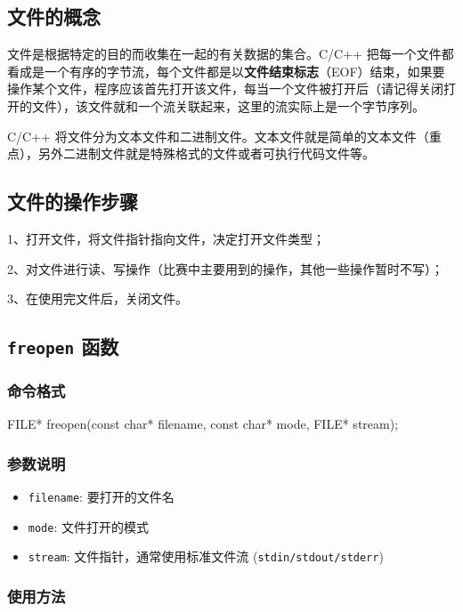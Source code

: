 
\subsection{文件的概念}

文件是根据特定的目的而收集在一起的有关数据的集合。C/C++ 把每一个文件都看成是一个有序的字节流，每个文件都是以\textbf{文件结束标志}（EOF）结束，如果要操作某个文件，程序应该首先打开该文件，每当一个文件被打开后（请记得关闭打开的文件），该文件就和一个流关联起来，这里的流实际上是一个字节序列。  

C/C++ 将文件分为文本文件和二进制文件。文本文件就是简单的文本文件（重点），另外二进制文件就是特殊格式的文件或者可执行代码文件等。

\subsection{文件的操作步骤}

 1、打开文件，将文件指针指向文件，决定打开文件类型；  

 2、对文件进行读、写操作（比赛中主要用到的操作，其他一些操作暂时不写）；  

 3、在使用完文件后，关闭文件。  

\subsection{\texttt{freopen} 函数}

\subsubsection{命令格式}

\begin{cppcode}
FILE* freopen(const char* filename, const char* mode, FILE* stream);
\end{cppcode}

\subsubsection{参数说明}

\begin{itemize}
\item \texttt{filename}: 要打开的文件名
\item \texttt{mode}: 文件打开的模式
\item \texttt{stream}: 文件指针，通常使用标准文件流 (\texttt{stdin/stdout/stderr})  
\end{itemize}

\subsubsection{使用方法}

